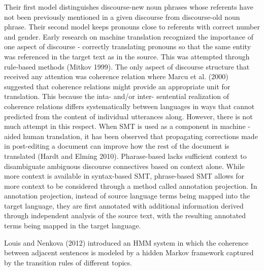 Their first model distinguishes discourse-new noun phrases whose referents have not been previously mentioned in a given discourse from discourse-old noun phrase. 
Their second model keeps pronouns close to referents with correct number and gender. 
Early research on machine translation recognized the importance of one aspect of discourse - correctly translating pronouns so that the same entity was referenced in the target text  as in the source. 
This was attempted through rule-based methods (Mitkov  1999).
The only aspect of discourse structure that received any attention was coherence relation where Marcu et al. (2000) suggested that coherence relations might provide an appropriate unit for translation. 
This because the inta- and/or inter- sentential realization of coherence relations differs systematically between languages in ways that cannot predicted from the content of individual utterances along. 
However, there is not much attempt in this respect. 
When SMT is used as a component in machine -aided human translation, it has been observed that propagating corrections made in post-editing a document can improve how the rest of the document is translated (Hardt and Elming 2010). 
Pharase-based lacks sufficient context to disambiguate ambiguous discourse connectives based on context alone. 
While more context is available in syntax-based SMT, phrase-based SMT allows  for more context to be considered through a method called annotation projection. 
In annotation projection, instead of source language terms being mapped into the target language, they are first annotated with additional information derived through independent analysis of the source text, with the resulting annotated terms being mapped in the target language. 




Louis and Nenkova (2012) introduced an HMM system in which the coherence between adjacent sentences is modeled by a hidden Markov framework captured by the transition rules of different topics. 



